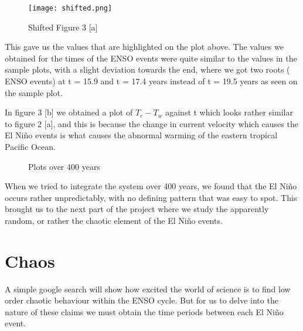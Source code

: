 \documentclass{article}
\begin{document}
\begin{figure}[h]
\centering
\texttt{[image: shifted.png]}
\caption{\label{fig:Diagram}Shifted Figure 3 [a]}
\end{figure}

This gave us the values that are highlighted on the plot above. The values we obtained for the times of the ENSO events were quite similar to the values in the sample plots, with a slight deviation towards the end, where we got two roots ( ENSO events) at t = 15.9 and t = 17.4 years instead of t = 19.5 years as seen on the sample plot. 

In figure 3 [b] we obtained a plot of $T_e - T_w$ against t which looks rather similar to figure 2 [a], and this is because the change in current velocity which causes the El Niño events is what causes the abnormal warming of the eastern tropical Pacific Ocean. 


\begin{figure}
    \centering
    \qquad
    \label{fig:example}%

    \centering
    \qquad
    \caption{Plots over 400 years}%
    \label{fig:example}%


\end{figure}

\hspace{}

When we tried to integrate the system over 400 years, we found that the El Niño occurs rather unpredictably, with no defining pattern that was easy to spot. This brought us to the next part of the project where we study the apparently random, or rather the chaotic element of the El Niño events. 

\newpage

\section{Chaos}

A simple google search will show how excited the world of science is to find low order chaotic behaviour within the ENSO cycle. But for us to delve into the nature of these claims we must obtain the time periods between each El Niño event. 
\end{document}
